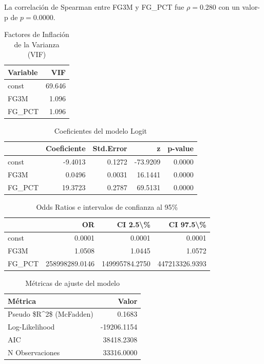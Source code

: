 La correlación de Spearman entre FG3M y FG\_PCT fue $\rho = 0.280$ con un valor-p de $p = 0.0000$.

\begin{table}[H]
\centering
\caption{Factores de Inflación de la Varianza (VIF)}
\label{tab:vif}
\begin{tabular}{lr}
\toprule
Variable & VIF \\
\midrule
const & 69.646 \\
FG3M & 1.096 \\
FG\_PCT & 1.096 \\
\bottomrule
\end{tabular}
\end{table}


\begin{table}[H]
\centering
\caption{Coeficientes del modelo Logit}
\label{tab:logit_coef}
\begin{tabular}{lrrrr}
\toprule
 & Coeficiente & Std.Error & z & p-value \\
\midrule
const & -9.4013 & 0.1272 & -73.9209 & 0.0000 \\
FG3M & 0.0496 & 0.0031 & 16.1441 & 0.0000 \\
FG\_PCT & 19.3723 & 0.2787 & 69.5131 & 0.0000 \\
\bottomrule
\end{tabular}
\end{table}


\begin{table}[H]
\centering
\caption{Odds Ratios e intervalos de confianza al 95\%}
\label{tab:odds_ratios}
\begin{tabular}{lrrr}
\toprule
 & OR & CI 2.5\textbackslash \% & CI 97.5\textbackslash \% \\
\midrule
const & 0.0001 & 0.0001 & 0.0001 \\
FG3M & 1.0508 & 1.0445 & 1.0572 \\
FG\_PCT & 258998289.0146 & 149995784.2750 & 447213326.9393 \\
\bottomrule
\end{tabular}
\end{table}


\begin{table}[H]
\centering
\caption{Métricas de ajuste del modelo}
\label{tab:metricas}
\begin{tabular}{lr}
\toprule
Métrica & Valor \\
\midrule
Pseudo \$R\textasciicircum 2\$ (McFadden) & 0.1683 \\
Log-Likelihood & -19206.1154 \\
AIC & 38418.2308 \\
N Observaciones & 33316.0000 \\
\bottomrule
\end{tabular}
\end{table}

